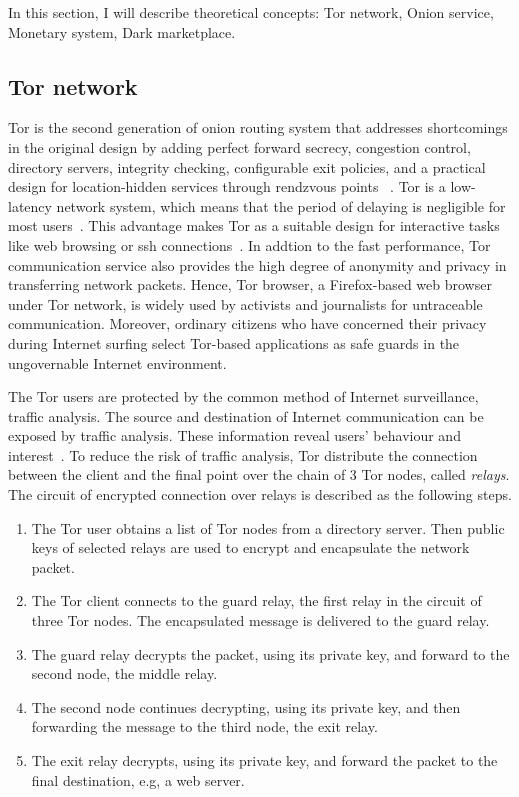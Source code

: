 In this section, I will describe theoretical concepts: Tor network, Onion service,
Monetary system, Dark marketplace.

\subsection{Tor network}
Tor is the second generation of onion routing system that addresses shortcomings
in the original design by adding perfect forward secrecy, congestion control,
directory servers, integrity checking, configurable exit policies, and a
practical design for location-hidden services through rendzvous points
~\cite{paper:tor_design}. Tor is a low-latency network system, which means that
the period of delaying is negligible for most users~\cite{report:overview_tor}.
This advantage makes Tor as a
suitable design for interactive tasks like web browsing or \acrshort{ssh}
connections~\cite{dis:usage_of_onion_services}. In addtion to the fast performance,
Tor communication service also provides the high degree of anonymity and privacy
in transferring network packets. Hence, Tor browser, a Firefox-based web browser
under Tor network, is widely used by activists and journalists for untraceable
communication. Moreover, ordinary citizens who have concerned their privacy during
Internet surfing select Tor-based applications as safe guards in the ungovernable
Internet environment.

The Tor users are protected by the common method of Internet surveillance, traffic
analysis. The source and destination of Internet communication can be exposed by
traffic analysis. These information reveal users' behaviour and interest~\cite{web:onion_network}.
To reduce the risk of traffic analysis, Tor distribute the connection between the
client and the final point over the chain of 3 Tor nodes, called \emph{relays}.
The circuit of encrypted connection over relays is described as the following steps.
\begin{enumerate}
    \item The Tor user obtains a list of Tor nodes from a
    directory server. Then public keys of selected relays are used to encrypt and
    encapsulate the network packet.  
    \item The Tor client connects to the guard relay, the first relay in the circuit
    of three Tor nodes. The encapsulated message is delivered to the guard relay.
    \item The guard relay decrypts the packet, using its private key, 
    and forward to the second node, the middle relay.
    \item The second node continues decrypting, using its private key, and then
    forwarding the message to the third node, the exit relay.
    \item The exit relay decrypts, using its private key, and forward the packet
    to the final destination, e.g, a web server.
\end{enumerate}

